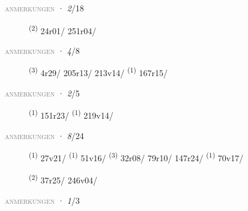 \textsc{\textcolor{gray}{anmerkungen}}
\ENTRYEND
\noindent{} · \textit{2}/18 \LEMMALINE
\begin{description}
    \item[]  \textsuperscript{(2)} \mbox{24r01/} \mbox{251r04/}
\end{description}
\textsc{\textcolor{gray}{anmerkungen}}
\ENTRYEND
\noindent{} · \textit{4}/8 \LEMMALINE
\begin{description}
    \item[]  \textsuperscript{(3)} \mbox{4r29/} \mbox{205r13/} \mbox{213v14/} \CASEBREAK {} \textsuperscript{(1)} \mbox{167r15/}
\end{description}
\textsc{\textcolor{gray}{anmerkungen}}
\ENTRYEND
\noindent{} · \textit{2}/5 \LEMMALINE
\begin{description}
    \item[]  \textsuperscript{(1)} \mbox{151r23/} \CASEBREAK {} \textsuperscript{(1)} \mbox{219v14/}
\end{description}
\textsc{\textcolor{gray}{anmerkungen}}
\ENTRYEND
\noindent{} · \textit{8}/24 \LEMMALINE
\begin{description}
    \item[]  \textsuperscript{(1)} \mbox{27v21/} \CASEBREAK {} \textsuperscript{(1)} \mbox{51v16/} \CASEBREAK {} \textsuperscript{(3)} \mbox{32r08/} \mbox{79r10/} \mbox{147r24/} \CASEBREAK {} \textsuperscript{(1)} \mbox{70v17/}
    \item[]  \textsuperscript{(2)} \mbox{37r25/} \mbox{246v04/}
\end{description}
\textsc{\textcolor{gray}{anmerkungen}}
\ENTRYEND
\noindent{} · \textit{1}/3 \LEMMALINE
